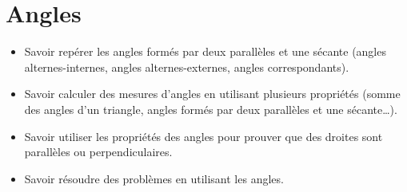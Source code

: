 \chapter{Angles}\label{ChAngles}

\vspace{5cm}
\begin{acquis}
\begin{itemize}
\item Savoir repérer les angles formés par deux parallèles et une sécante (angles alternes-internes, angles alternes-externes, angles correspondants).
\item Savoir calculer des mesures d’angles en utilisant plusieurs propriétés (somme des angles d'un triangle, angles formés par deux parallèles et une sécante…).
\columnbreak
\item Savoir utiliser les propriétés des angles pour prouver que des droites sont parallèles ou perpendiculaires.
\item Savoir résoudre des problèmes en utilisant les angles.
\end{itemize}
\end{acquis}


\activites  


\cours


\exercicesbase
\begin{colonne*exercice}

\end{colonne*exercice}


\exercicesappr
\begin{colonne*exercice}

\end{colonne*exercice}

\connaissances


\TravauxPratiques


\recreation %



